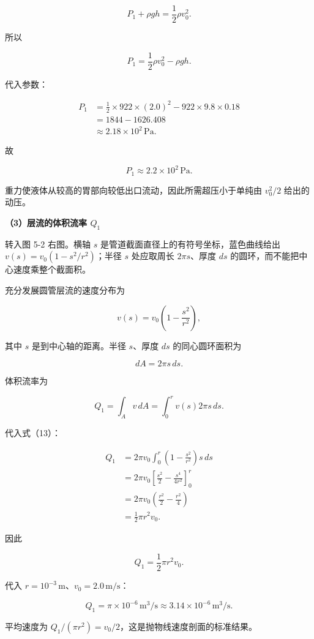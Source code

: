 \documentclass[12pt,a4paper,UTF8]{ctexart}
\begin{document}
\[
P_1+\rho gh=\frac12\rho v_0^2.
\]

所以

\[
\boxed{P_1=\frac12\rho v_0^2-\rho gh}.
\tag{11}
\]

代入参数：

\[
\begin{aligned}
P_1
&=\frac12\times922\times(2.0)^2
-922\times9.8\times0.18\\
&=1844-1626.408\\
&\approx2.18\times10^2\,\mathrm{Pa}.
\end{aligned}
\]

故

\[
\boxed{P_1\approx2.2\times10^2\,\mathrm{Pa}}.
\tag{12}
\]

重力使液体从较高的胃部向较低出口流动，因此所需超压小于单纯由 \(v_0^2/2\)
给出的动压。

\textbf{（3）层流的体积流率 \(Q_1\)}

转入图 5-2 右图。横轴 \(s\) 是管道截面直径上的有符号坐标，蓝色曲线给出
\(v(s)=v_0(1-s^2/r^2)\)；半径 \(s\) 处应取周长 \(2\pi s\)、厚度 \(ds\)
的圆环，而不能把中心速度乘整个截面积。

充分发展圆管层流的速度分布为

\[
v(s)=v_0\left(1-\frac{s^2}{r^2}\right),
\tag{13}
\]

其中 \(s\) 是到中心轴的距离。半径 \(s\)、厚度 \(ds\) 的同心圆环面积为

\[
dA=2\pi s\,ds.
\]

体积流率为

\[
Q_1=\int_Av\,dA
=\int_0^rv(s)2\pi s\,ds.
\]

代入式（13）：

\[
\begin{aligned}
Q_1
&=2\pi v_0\int_0^r\left(1-\frac{s^2}{r^2}\right)s\,ds\\
&=2\pi v_0\left[\frac{s^2}{2}-\frac{s^4}{4r^2}\right]_0^r\\
&=2\pi v_0\left(\frac{r^2}{2}-\frac{r^2}{4}\right)\\
&=\frac12\pi r^2v_0.
\end{aligned}
\]

因此

\[
\boxed{Q_1=\frac12\pi r^2v_0}.
\tag{14}
\]

代入 \(r=10^{-3}\,\mathrm m\)、\(v_0=2.0\,\mathrm{m/s}\)：

\[
\boxed{Q_1=\pi\times10^{-6}\,\mathrm{m^3/s}
\approx3.14\times10^{-6}\,\mathrm{m^3/s}}.
\tag{15}
\]

平均速度为 \(Q_1/(\pi r^2)=v_0/2\)，这是抛物线速度剖面的标准结果。
\end{document}
